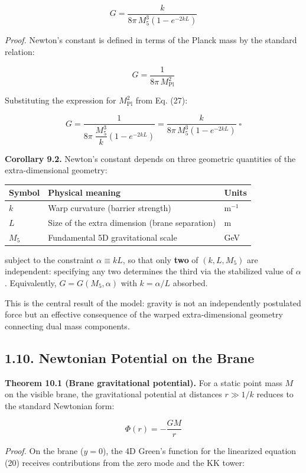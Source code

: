 \documentclass[
  11pt,
]{article}
\begin{document}
\[\boxed{G = \frac{k}{8\pi\,M_5^3\left(1 - e^{-2kL}\right)}} \tag{31}\]

\emph{Proof.} Newton's constant is defined in terms of the Planck mass
by the standard relation:

\[G = \frac{1}{8\pi\,M_{\text{Pl}}^2} \tag{32}\]

Substituting the expression for \(M_{\text{Pl}}^2\) from Eq. (27):

\[G = \frac{1}{8\pi\;\dfrac{M_5^3}{k}\left(1 - e^{-2kL}\right)} = \frac{k}{8\pi\,M_5^3\left(1 - e^{-2kL}\right)} \;\square \tag{33}\]

\textbf{Corollary 9.2.} Newton's constant depends on three geometric
quantities of the extra-dimensional geometry:

\begin{longtable}[]{@{}lll@{}}
\toprule
Symbol & Physical meaning & Units\tabularnewline
\midrule
\endhead
\(k\) & Warp curvature (barrier strength) & m\(^{-1}\)\tabularnewline
\(L\) & Size of the extra dimension (brane separation) &
m\tabularnewline
\(M_5\) & Fundamental 5D gravitational scale & GeV\tabularnewline
\bottomrule
\end{longtable}

subject to the constraint \(\alpha \equiv kL\), so that only
\textbf{two} of \((k, L, M_5)\) are independent: specifying any two
determines the third via the stabilized value of \(\alpha\).
Equivalently, \(G = G(M_5, \alpha)\) with \(k = \alpha/L\) absorbed.

This is the central result of the model: gravity is not an independently
postulated force but an effective consequence of the warped
extra-dimensional geometry connecting dual mass components.

\bigskip

\hypertarget{newtonian-potential-on-the-brane}{%
\subsection{1.10. Newtonian Potential on the
Brane}\label{newtonian-potential-on-the-brane}}

\textbf{Theorem 10.1 (Brane gravitational potential).} For a static
point mass \(M\) on the visible brane, the gravitational potential at
distances \(r \gg 1/k\) reduces to the standard Newtonian form:

\[\Phi(r) = -\frac{GM}{r} \tag{34}\]

\emph{Proof.} On the brane (\(y = 0\)), the 4D Green's function for the
linearized equation (20) receives contributions from the zero mode and
the KK tower:
\end{document}
